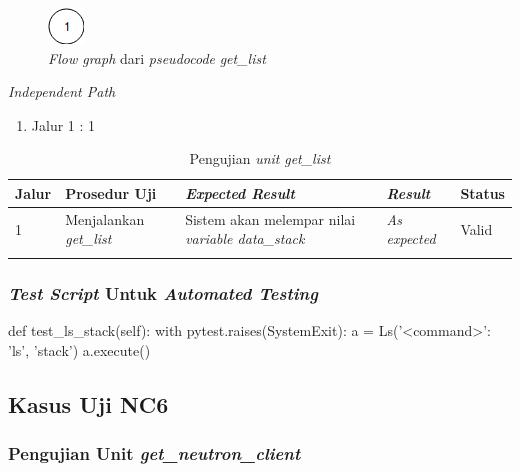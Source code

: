 \begin{figure}[H]
  \centering
  \includegraphics[width=.06\linewidth]{img/test-case/1node}
  \caption{\emph{Flow graph} dari \emph{pseudocode} \emph{get\_list}}
  \label{cfg:get_list}
\end{figure}

\noindent
\emph{Independent Path}

\begin{enumerate}
\item Jalur 1 : 1
\end{enumerate}

\begin{longtable}{|P{.06\textwidth}|P{.30\textwidth}|P{.30\textwidth}|P{.10\textwidth}|P{.08\textwidth}|}
  \hline
  \textbf{Jalur} & \textbf{Prosedur Uji} & \textbf{\emph{Expected Result}}
  & \textbf{\emph{Result}} & \textbf{Status} \\\hline
  1 & Menjalankan \emph{get\_list}  & Sistem akan melempar nilai \emph{variable data\_stack}
  & \emph{As expected} & Valid \\\hline
  \caption{Pengujian \emph{unit} \emph{get\_list}}
  \label{jalur:get_list}
\end{longtable}


\subsubsection{\emph{Test Script} Untuk \emph{Automated Testing}}


\begin{code}
\begin{ignasicblock}[title=test\_ls\_stack,minted language=Python]
def test_ls_stack(self):
        with pytest.raises(SystemExit):
            a = Ls({'<command>': 'ls'}, 'stack')
            a.execute()
\end{ignasicblock}
\label{ts:ls-stack}
\end{code}

\subsection{Kasus Uji NC6}

\subsubsection{Pengujian Unit \emph{get\_neutron\_client}}

